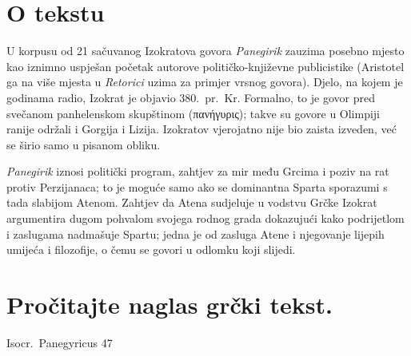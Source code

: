 

\section*{O tekstu}

U korpusu od 21 sačuvanog Izokratova govora \textit{Panegirik} zauzima posebno mjesto kao iznimno uspješan početak autorove političko-književne publicistike (Aristotel ga na više mjesta u \textit{Retorici} uzima za primjer vrsnog govora). Djelo, na kojem je godinama radio, Izokrat je objavio 380.\ pr.~Kr. Formalno, to je govor pred svečanom panhelenskom skupštinom \textgreek[variant=ancient]{(πανήγυρις);} takve su govore u Olimpiji ranije održali i Gorgija i Lizija. Izokratov vjerojatno nije bio zaista izveden, već se širio samo u pisanom obliku. 

\textit{Panegirik} iznosi politički program, zahtjev za mir među Grcima i poziv na rat protiv Perzijanaca; to je moguće samo ako se dominantna Sparta sporazumi s tada slabijom Atenom. Zahtjev da Atena sudjeluje u vodstvu Grčke Izokrat argumentira dugom pohvalom svojega rodnog grada dokazujući kako podrijetlom i zaslugama nadmašuje Spartu; jedna je od zasluga Atene i njegovanje lijepih umijeća i filozofije, o čemu se govori u odlomku koji slijedi.

\newpage

\section*{Pročitajte naglas grčki tekst.}

Isocr.\ Panegyricus 47


\medskip

